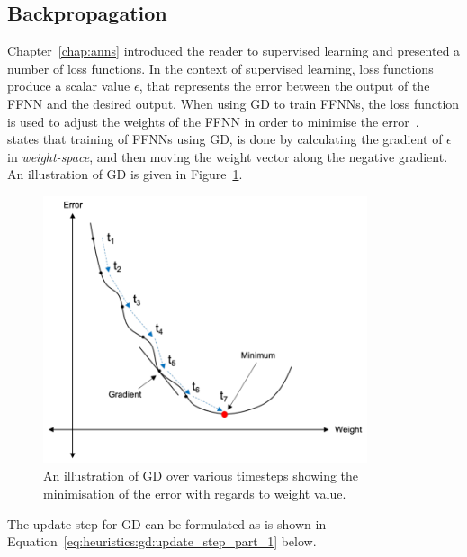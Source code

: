\subsection{Backpropagation}\label{sec:heuristics:gd:backpropagation}

Chapter~\ref{chap:anns} introduced the reader to supervised learning and presented a number of loss functions. In the context of supervised learning, loss functions produce a scalar value $\epsilon$, that represents the error between the output of the \acs{FFNN} and the desired output. When using \acs{GD} to train \acp{FFNN}, the loss function is used to adjust the weights of the \acs{FFNN} in order to minimise the error~\cite{ref:engelbrecht:2007}.~\citeauthor{ref:engelbrecht:2007}~\cite{ref:engelbrecht:2007} states that training of \acp{FFNN} using \acs{GD}, is done by calculating the gradient of $\epsilon$ in \textit{weight-space}, and then moving the weight vector along the negative gradient. An illustration of \acs{GD} is given in Figure~\ref{fig:heuristics:gd:gd_illustration}.

\begin{figure}[htbp]
      \centering
      \includegraphics[width=0.85\textwidth]{images/gradient_descent.pdf}
      \caption{An illustration of \acs{GD} over various timesteps showing the minimisation of the error with regards to weight value.}
      \label{fig:heuristics:gd:gd_illustration}
\end{figure}

\noindent
The update step for \acs{GD} can be formulated as is shown in Equation~\eqref{eq:heuristics:gd:update_step_part_1} below.

